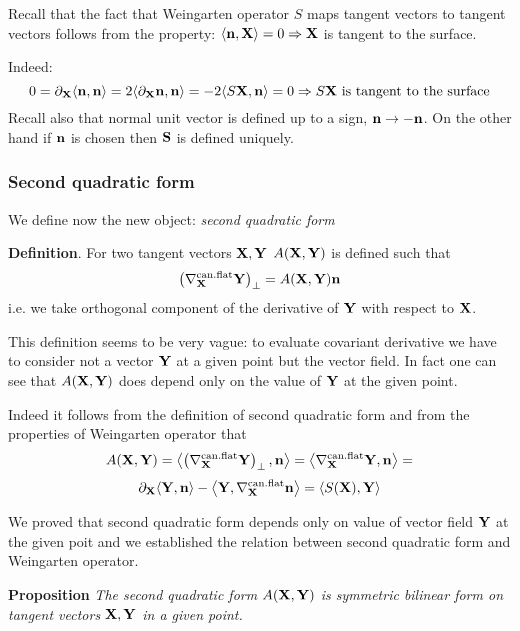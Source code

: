 \documentclass[12pt]{article}
\theoremstyle{theorem}
\numberwithin{equation}{section}
\begin{document}
  Recall that the fact that Weingarten operator $S$ maps tangent vectors to tangent vectors follows from the property:
  $\langle\n,\X\rangle=0\Rightarrow \X$ is tangent to the surface.

  Indeed:
     $$
 0= \p_\X\langle\n,\n\rangle=2\langle\p_\X\n,\n\rangle=-2\langle S\X,\n\rangle=0\Rightarrow S\X\,\,
 \hbox {is tangent to the surface}
     $$
     \m
Recall also that normal unit vector is defined up to a sign, $\n\to -\n$. On the other hand if $\n$
is chosen then $\S$ is defined uniquely.


\subsubsection {Second quadratic form}

We define now the new object: {\it second quadratic form}

{\bf Definition}. For two tangent vectors $\X, \Y$
$A(\X,\Y)$ is defined such that
\begin{equation}\label{secondquadraticform1}
    \left(\nabla^{\rm can.flat}_\X \Y\right)_\bot=A(\X,\Y)\n
\end{equation}
i.e. we take orthogonal component of the derivative of $\Y$ with respect to $\X$.

This definition seems to be very vague: to evaluate covariant derivative we have to consider not a
vector $\Y$ at a given point
but  the vector field.
In fact one can see that  $A(\X,\Y)$ does depend only on the value of $\Y$ at the given point.

Indeed it follows from the definition of second quadratic form and from the properties of Weingarten operator that
        $$
         A(\X,\Y)=\left\langle\left(\nabla^{\rm can.flat}_\X \Y\right)_\bot,\n\right\rangle=
    \left\langle\nabla^{\rm can.flat}_\X \Y,\n\right\rangle=
        $$
\begin{equation}\label{properofsecquadrform4}
    \p_\X \langle\Y,\n\rangle-\left\langle \Y,\nabla^{\rm can.flat}_\X\n\right\rangle=\langle S(\X), \Y\rangle
\end{equation}



We proved that second quadratic form depends only on value of vector field $\Y$ at the given poit and we established
the relation between second quadratic form and Weingarten operator.

\m

{\bf Proposition} {\it The second quadratic form $A(\X,\Y)$ is symmetric bilinear form on tangent vectors $\X,\Y$
in a given point.}
\end{document}
